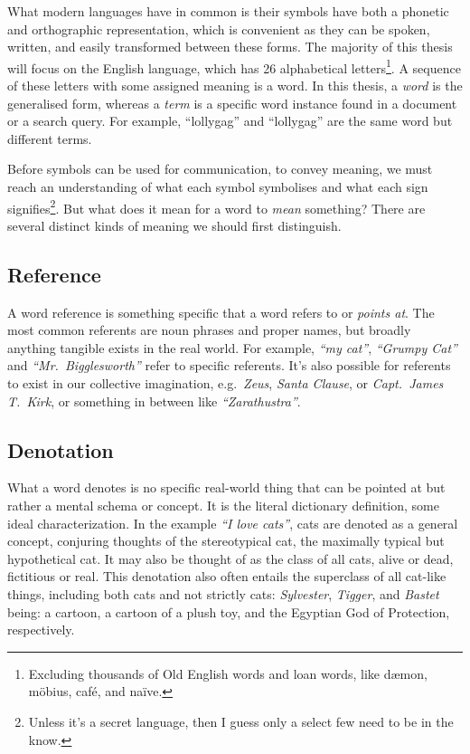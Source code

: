 What modern languages have in common is their symbols have both a phonetic and orthographic representation, which is convenient as they can be spoken, written, and easily transformed between these forms. The majority of this thesis will focus on the English language, which has 26 alphabetical letters\footnote{Excluding thousands of Old English words and loan words, like d{\ae}mon, m{\"o}bius, caf{\'e}, and na{\"i}ve.}. A sequence of these letters with some assigned meaning is a word. In this thesis, a \textit{word} is the generalised form, whereas a \textit{term} is a specific word instance found in a document or a search query. For example, ``lollygag'' and ``lollygag'' are the same word but different terms.



Before symbols can be used for communication, to convey meaning, we must reach an understanding of what each symbol symbolises and what each sign signifies\footnote{Unless it's a secret language, then I guess only a select few need to be in the know.}. But what does it mean for a word to \textit{mean} something? There are several distinct kinds of meaning we should first distinguish.

\subsection{Reference}
A word reference is something specific that a word refers to or \textit{points at}. The most common referents are noun phrases and proper names, but broadly anything tangible exists in the real world. For example, \textit{``my cat''}, \textit{``Grumpy Cat''} and \textit{``Mr.\ Bigglesworth''} refer to specific referents. It's also possible for referents to exist in our collective imagination, e.g.\ \textit{Zeus}, \textit{Santa Clause}, or \textit{Capt.\ James T.\ Kirk}, or something in between like \textit{``Zarathustra''}.



\subsection{Denotation}
What a word denotes is no specific real-world thing that can be pointed at but rather a mental schema or concept. It is the literal dictionary definition, some ideal characterization. In the example \textit{``I love cats''}, cats are denoted as a general concept, conjuring thoughts of the stereotypical cat, the maximally typical but hypothetical cat. It may also be thought of as the class of all cats, alive or dead, fictitious or real. This denotation also often entails the superclass of all cat-like things, including both cats and not strictly cats: \textit{Sylvester}, \textit{Tigger}, and \textit{Bastet} being: a cartoon, a cartoon of a plush toy, and the Egyptian God of Protection, respectively.

